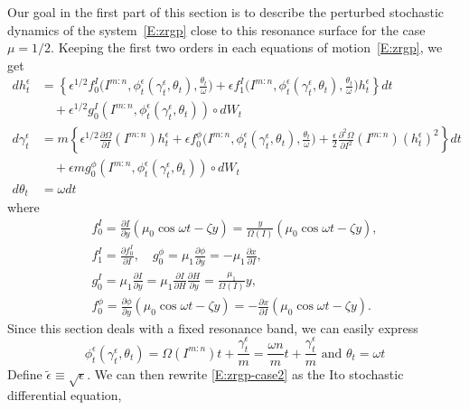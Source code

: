 Our goal in the first part of this section is to describe the perturbed stochastic dynamics of the system~\eqref{E:zrgp} close to this resonance surface for the case $\mu=1/2$. Keeping the first two orders in each equations of motion~\eqref{E:zrgp}, we get
\begin{equation}
\begin{aligned}
d h_t^\epsilon &= \left\{\epsilon^{1/2} f^I_0\Big(I^{m:n},\phi_t^\epsilon(\gamma_t^\epsilon,\theta_t),\frac{\theta_t}{\omega}\Big) + \epsilon f^I_1\Big(I^{m:n}, \phi_t^\epsilon(\gamma_t^\epsilon, \theta_t), \frac{\theta_t}{\omega}\Big) h_t^\epsilon \right\} dt\\
&\quad + \epsilon^{1/2} g^I_0(I^{m:n}, \phi_t^\epsilon(\gamma_t^\epsilon, \theta_t)) \circ dW_t\\
d \gamma_t^\epsilon &= m \left\{\epsilon^{1/2} \frac{\partial \Omega}{\partial I} (I^{m:n}) {h}_t^\epsilon + \epsilon f^\phi_0\Big(I^{m:n}, \phi_t^\epsilon(\gamma_t^\epsilon, \theta_t), \frac{\theta_t}{\omega}\Big) + \frac{\epsilon}{2} \frac{\partial^2 \Omega}{\partial I^2}(I^{m:n}) (h^\epsilon_t)^2 \right\} dt\\
&\quad + \epsilon  m g^\phi_0(I^{m:n}, \phi_t^\epsilon(\gamma_t^\epsilon, \theta_t)) \circ dW_t\\
d {\theta}_t &= \omega d t
\end{aligned}
\label{E:zrgp-case2}
\end{equation}
where
\begin{gather*}
f_0^I = \frac{\partial I}{\partial y} (\mu_0 \cos \omega t - \zeta y) = \frac{y}{\Omega(I)} (\mu_0 \cos \omega t - \zeta y),\\
f_1^I = \frac{\partial f_0^I}{\partial I}, \quad g_0^\phi = \mu_1 \frac{\partial \phi}{\partial y} = - \mu_1 \frac{\partial x}{\partial I},\\
g_0^I = \mu_1 \frac{\partial I}{\partial y} = \mu_1 \frac{\partial I}{\partial H}\frac{\partial H}{\partial y} = \frac{\mu_1}{\Omega(I)} y,\\
f_0^\phi = \frac{\partial \phi}{\partial y} (\mu_0 \cos \omega t - \zeta y) = -\frac{\partial x}{\partial I} (\mu_0 \cos \omega t - \zeta y).
\end{gather*}
Since this section deals with a fixed resonance band, we can easily express
\[
\phi_t^\epsilon(\gamma_t^\epsilon,\theta_t)= \Omega(I^{m:n}) t +  \frac{\gamma_t^\epsilon}{m} = \frac{\omega n}{m} t + \frac{\gamma_t^\epsilon}{m} \text{ and } \theta_t= \omega t
\]
Define $\tilde\epsilon\equiv{\sqrt{\epsilon}}$. We can then rewrite \eqref{E:zrgp-case2} as the Ito stochastic differential equation,
